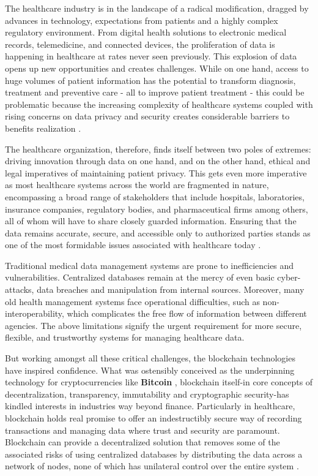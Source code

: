 The healthcare industry is in the landscape of 
a radical modification, dragged by advances in technology, 
expectations from patients and a highly complex regulatory environment. 
From digital health solutions to electronic medical records, telemedicine, 
and connected devices, the proliferation of data is happening in healthcare at rates never seen previously. 
This explosion of data opens up new opportunities and creates challenges. 
While on one hand, access to huge volumes of patient information has the potential to transform diagnosis, 
treatment and preventive care - all to improve patient treatment - this could be problematic because the 
increasing complexity of healthcare systems coupled with rising concerns on data privacy and security creates 
considerable barriers to benefits realization \cite{it-challenges-healthcare}.

The healthcare organization, therefore, finds itself between two poles of extremes: 
driving innovation through data on one hand, and on the other hand, ethical and legal imperatives 
of maintaining patient privacy. This gets even more imperative as most healthcare systems across 
the world are fragmented in nature, encompassing a broad range of stakeholders that include hospitals, 
laboratories, insurance companies, regulatory bodies, and pharmaceutical firms among others, all of whom will 
have to share closely guarded information. Ensuring that the data remains accurate, secure, and accessible only 
to authorized parties stands as one of the most formidable issues associated with healthcare today \cite{healthcare-data-fragmentation}.

Traditional medical data management systems are prone to inefficiencies and vulnerabilities. 
Centralized databases remain at the mercy of even basic cyber-attacks, data breaches and manipulation from 
internal sources. Moreover, many old health management systems face operational difficulties, 
such as non-interoperability, which complicates the free flow of information between different agencies. 
The above limitations signify the urgent requirement for more secure, flexible, and trustworthy systems for 
managing healthcare data.

But working amongst all these critical challenges, 
the blockchain technologies have inspired confidence. 
What was ostensibly conceived as the underpinning technology for cryptocurrencies 
like \textbf{Bitcoin} \cite{btc}, blockchain itself-in core concepts of decentralization, 
transparency, immutability  and cryptographic security-has kindled interests in industries way beyond finance. 
Particularly in healthcare, blockchain holds real promise to offer an indestructibly secure way of recording 
transactions and managing data where trust and security are paramount. Blockchain can provide a decentralized 
solution that removes some of the associated risks of using centralized databases by distributing the data 
across a network of nodes, none of which has unilateral control over the entire system \cite{healthcare-data-breaches}.

